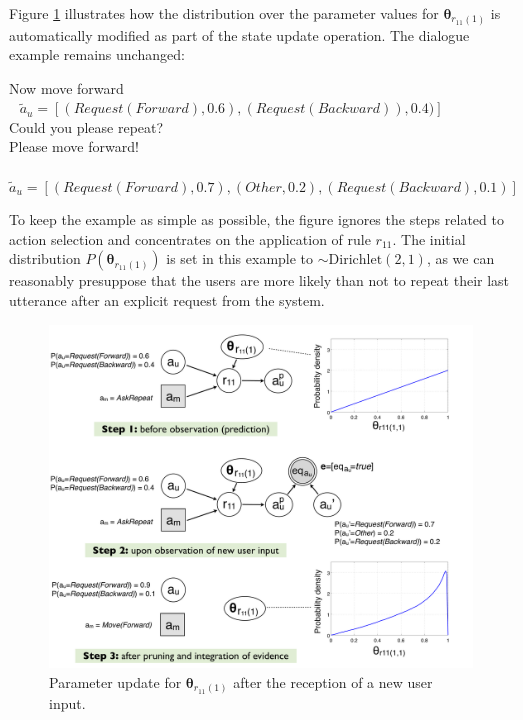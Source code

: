 Figure \ref{fig:learningexample} illustrates how the distribution over the parameter values for $\boldsymbol\theta_{r_{11}(1)}$ is automatically modified as part of the state update operation.  The dialogue example remains unchanged:
\begin{dialogue} 
 Now move forward \\ $\phantom{b}$ $\tilde{a}_u = [ (\mathit{Request(Forward)}, 0.6), (\mathit{Request(Backward)}), 0.4)]$  \\[-3mm]
 Could you please repeat? \\[-3mm]
 Please move forward! \\ $\phantom{b}$ $\tilde{a}_u = [ (\mathit{Request(Forward)}, 0.7), (\mathit{Other}, 0.2), (\mathit{Request(Backward)}, 0.1) ]$ \\[-4mm]
\end{dialogue} 

To keep the example as simple as possible, the figure ignores the steps related to action selection and concentrates on the application of rule $r_{11}$.  The initial distribution $P(\boldsymbol\theta_{r_{11}(1)})$ is set in this example to $\sim \mathrm{Dirichlet}(2,1)$, as we can reasonably presuppose that the users are more likely than not to repeat their last utterance after an explicit request from the system.

\begin{figure}[ht]
\centering
\includegraphics[scale=0.30]{imgs/learningexample.pdf}
\caption{Parameter update for $\boldsymbol\theta_{r_{11}(1)}$ after the reception of a new user input. }
\label{fig:learningexample}
\end{figure}


